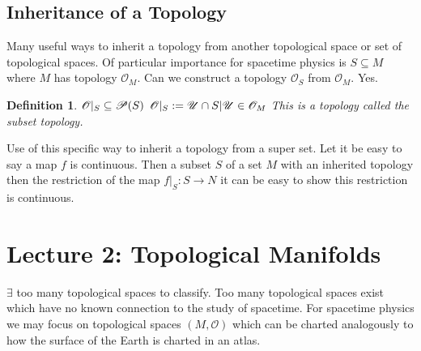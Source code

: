 \documentclass[10pt, oneside]{article}
\newtheorem{defn}{Definition}
\begin{document}
  \subsection{Inheritance of a Topology}
     Many useful ways to inherit a topology from another topological space or set of topological spaces. Of particular importance for spacetime physics is $S \subseteq M$ where $M$ has topology $\mathcal{O}_M$.
     Can we construct a topology $\mathcal{O}_S$ from $\mathcal{O}_M$. Yes.
     \begin{defn}
        $\mathcal{O} |_S \subseteq \mathcal{P}(S) \\$
        $\mathcal{O}|_S := {\mathcal{U} \cap S | \mathcal{U} \in \mathcal{O}_M} \\$
        This is a topology called the subset topology.
     \end{defn}
     Use of this specific way to inherit a topology from a super set. Let it be easy to say a map $f$ is continuous. Then a subset $S$ of a set $M$ with an inherited topology then the restriction of the map $f|_S: S \to N$ it can be easy to show this restriction is continuous.
\section{Lecture 2: Topological Manifolds \cite{TopologyM}}
     $\exists$ too many topological spaces to classify. Too many topological spaces exist which have no known connection to the study of spacetime. For spacetime physics we may focus on topological spaces $(M, \mathcal{O})$ which can be charted analogously to how the surface of the Earth is charted in an atlas.
\end{document}
